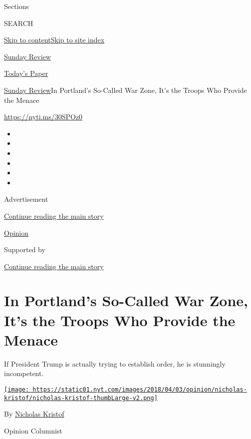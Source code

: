 Sections

SEARCH

\protect\hyperlink{site-content}{Skip to
content}\protect\hyperlink{site-index}{Skip to site index}

\href{https://www.nytimes.com/section/opinion/sunday}{Sunday Review}

\href{https://myaccount.nytimes.com/auth/login?response_type=cookie\&client_id=vi}{}

\href{https://www.nytimes.com/section/todayspaper}{Today's Paper}

\href{/section/opinion/sunday}{Sunday Review}\textbar{}In Portland's
So-Called War Zone, It's the Troops Who Provide the Menace

\url{https://nyti.ms/30SPOz0}

\begin{itemize}
\item
\item
\item
\item
\item
\item
\end{itemize}

Advertisement

\protect\hyperlink{after-top}{Continue reading the main story}

\href{/section/opinion}{Opinion}

Supported by

\protect\hyperlink{after-sponsor}{Continue reading the main story}

\hypertarget{in-portlands-so-called-war-zone-its-the-troops-who-provide-the-menace}{%
\section{In Portland's So-Called War Zone, It's the Troops Who Provide
the
Menace}\label{in-portlands-so-called-war-zone-its-the-troops-who-provide-the-menace}}

If President Trump is actually trying to establish order, he is
stunningly incompetent.

\href{https://www.nytimes.com/column/nicholas-kristof}{\texttt{[image: https://static01.nyt.com/images/2018/04/03/opinion/nicholas-kristof/nicholas-kristof-thumbLarge-v2.png]}}

By \href{https://www.nytimes.com/column/nicholas-kristof}{Nicholas
Kristof}

Opinion Columnist

